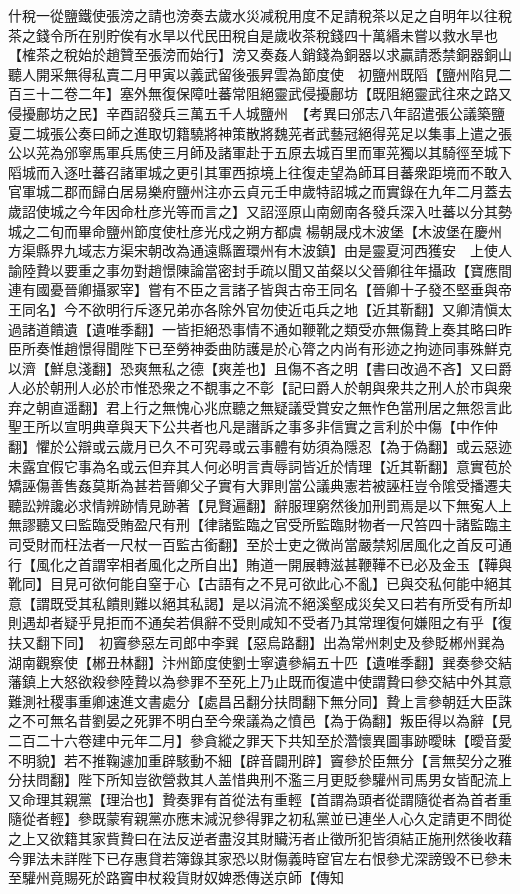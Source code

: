 什稅一從鹽鐵使張滂之請也滂奏去歲水災减稅用度不足請稅茶以足之自明年以往稅茶之錢令所在别貯俟有水旱以代民田稅自是歲收茶稅錢四十萬緡未嘗以救水旱也【榷茶之稅始於趙贊至張滂而始行】滂又奏姦人銷錢為銅器以求贏請悉禁銅器銅山聽人開采無得私賣二月甲寅以義武留後張昇雲為節度使　初鹽州既䧟【鹽州陷見二百三十二卷二年】塞外無復保障吐蕃常阻絕靈武侵擾鄜坊【既阻絕靈武往來之路又侵擾鄜坊之民】辛酉詔發兵三萬五千人城鹽州　【考異曰邠志八年詔遣張公議築鹽夏二城張公奏曰師之進取切籍驍將神策散將魏茪者武藝冠絕得茪足以集事上遣之張公以茪為邠寧馬軍兵馬使三月師及諸軍赴于五原去城百里而軍茪獨以其騎徑至城下䧟城而入逐吐蕃召諸軍城之更引其軍西掠境上往復走望為師耳目蕃衆距境而不敢入官軍城二郡而歸白居易樂府鹽州注亦云貞元壬申歲特詔城之而實錄在九年二月蓋去歲詔使城之今年因命杜彦光等而言之】又詔涇原山南劒南各發兵深入吐蕃以分其勢城之二旬而畢命鹽州節度使杜彦光戍之朔方都虞楊朝晟戍木波堡【木波堡在慶州方渠縣界九域志方渠宋朝改為通遠縣置環州有木波鎮】由是靈夏河西獲安　上使人諭陸贄以要重之事勿對趙憬陳論當密封手疏以聞又苖粲以父晉卿往年攝政【寶應間連有國憂晉卿攝冢宰】嘗有不臣之言諸子皆與古帝王同名【晉卿十子發丕堅垂與帝王同名】今不欲明行斥逐兄弟亦各除外官勿使近屯兵之地【近其靳翻】又卿清愼太過諸道饋遺【遺唯季翻】一皆拒絕恐事情不通如鞭靴之類受亦無傷贄上奏其略曰昨臣所奏惟趙憬得聞陛下已至勞神委曲防護是於心膂之内尚有形迹之拘迹同事殊鮮克以濟【鮮息淺翻】恐爽無私之德【爽差也】且傷不吝之明【書曰改過不吝】又曰爵人必於朝刑人必於市惟恐衆之不覩事之不彰【記曰爵人於朝與衆共之刑人於市與衆弃之朝直遥翻】君上行之無愧心兆庶聽之無疑議受賞安之無怍色當刑居之無怨言此聖王所以宣明典章與天下公共者也凡是譖訴之事多非信實之言利於中傷【中作仲翻】懼於公辯或云歲月已久不可究尋或云事體有妨須為隱忍【為于偽翻】或云惡迹未露宜假它事為名或云但弃其人何必明言責辱詞皆近於情理【近其靳翻】意實苞於矯誣傷善售姦莫斯為甚若晉卿父子實有大罪則當公議典憲若被誣枉豈令隂受播遷夫聽訟辨讒必求情辨跡情見跡著【見賢遍翻】辭服理窮然後加刑罰焉是以下無寃人上無謬聽又曰監臨受賄盈尺有刑【律諸監臨之官受所監臨財物者一尺笞四十諸監臨主司受財而枉法者一尺杖一百監古銜翻】至於士吏之微尚當嚴禁矧居風化之首反可通行【風化之首謂宰相者風化之所自出】賄道一開展轉滋甚鞭鞾不已必及金玉【鞾與靴同】目見可欲何能自窒于心【古語有之不見可欲此心不亂】已與交私何能中絕其意【謂既受其私饋則難以絕其私謁】是以涓流不絕溪壑成災矣又曰若有所受有所却則遇却者疑乎見拒而不通矣若俱辭不受則咸知不受者乃其常理復何嫌阻之有乎【復扶又翻下同】　初竇參惡左司郎中李巽【惡烏路翻】出為常州刺史及參貶郴州巽為湖南觀察使【郴丑林翻】汴州節度使劉士寧遺參絹五十匹【遺唯季翻】巽奏參交結藩鎮上大怒欲殺參陸贄以為參罪不至死上乃止既而復遣中使謂贄曰參交結中外其意難測社稷事重卿速進文書處分【處昌呂翻分扶問翻下無分同】贄上言參朝廷大臣誅之不可無名昔劉晏之死罪不明白至今衆議為之憤邑【為于偽翻】叛臣得以為辭【見二百二十六卷建中元年二月】參貪縱之罪天下共知至於濳懷異圖事跡曖昧【曖音愛不明貌】若不推鞠遽加重辟駭動不細【辟音闢刑辟】竇參於臣無分【言無契分之雅分扶問翻】陛下所知豈欲營救其人盖惜典刑不濫三月更貶參驩州司馬男女皆配流上又命理其親黨【理治也】贄奏罪有首從法有重輕【首謂為頭者從謂隨從者為首者重隨從者輕】參既蒙宥親黨亦應末減況參得罪之初私黨並已連坐人心久定請更不問從之上又欲籍其家貲贄曰在法反逆者盡沒其財贜汚者止徵所犯皆須結正施刑然後收藉今罪法未詳陛下已存惠貸若簿錄其家恐以財傷義時䆠官左右恨參尤深謗毁不已參未至驩州竟賜死於路竇申杖殺貨財奴婢悉傳送京師【傳知